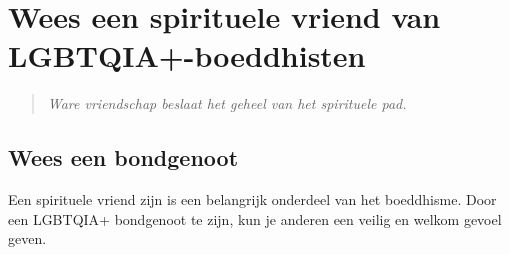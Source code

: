 \documentclass[12pt,openany]{book}
\begin{document}
\begin{figure}[h]
    \centering
\end{figure}

\chapter*{Wees een spirituele vriend van LGBTQIA+-boeddhisten}

\begin{quote}
\textit{Ware vriendschap beslaat het geheel van het spirituele pad.}
\end{quote}

\section*{Wees een bondgenoot}

Een spirituele vriend zijn is een belangrijk onderdeel van het boeddhisme. Door een LGBTQIA+ bondgenoot te zijn, kun je anderen een veilig en welkom gevoel geven.
\end{document}
